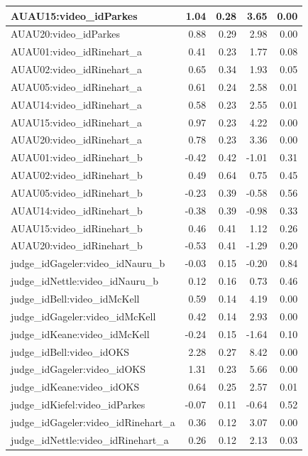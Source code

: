 \documentclass{monashthesis}
\begin{document}
\begin{tabular}{l|r|r|r|r}
\hline
AUAU15:video\_idParkes & 1.04 & 0.28 & 3.65 & 0.00\\
\hline
AUAU20:video\_idParkes & 0.88 & 0.29 & 2.98 & 0.00\\
\hline
AUAU01:video\_idRinehart\_a & 0.41 & 0.23 & 1.77 & 0.08\\
\hline
AUAU02:video\_idRinehart\_a & 0.65 & 0.34 & 1.93 & 0.05\\
\hline
AUAU05:video\_idRinehart\_a & 0.61 & 0.24 & 2.58 & 0.01\\
\hline
AUAU14:video\_idRinehart\_a & 0.58 & 0.23 & 2.55 & 0.01\\
\hline
AUAU15:video\_idRinehart\_a & 0.97 & 0.23 & 4.22 & 0.00\\
\hline
AUAU20:video\_idRinehart\_a & 0.78 & 0.23 & 3.36 & 0.00\\
\hline
AUAU01:video\_idRinehart\_b & -0.42 & 0.42 & -1.01 & 0.31\\
\hline
AUAU02:video\_idRinehart\_b & 0.49 & 0.64 & 0.75 & 0.45\\
\hline
AUAU05:video\_idRinehart\_b & -0.23 & 0.39 & -0.58 & 0.56\\
\hline
AUAU14:video\_idRinehart\_b & -0.38 & 0.39 & -0.98 & 0.33\\
\hline
AUAU15:video\_idRinehart\_b & 0.46 & 0.41 & 1.12 & 0.26\\
\hline
AUAU20:video\_idRinehart\_b & -0.53 & 0.41 & -1.29 & 0.20\\
\hline
judge\_idGageler:video\_idNauru\_b & -0.03 & 0.15 & -0.20 & 0.84\\
\hline
judge\_idNettle:video\_idNauru\_b & 0.12 & 0.16 & 0.73 & 0.46\\
\hline
judge\_idBell:video\_idMcKell & 0.59 & 0.14 & 4.19 & 0.00\\
\hline
judge\_idGageler:video\_idMcKell & 0.42 & 0.14 & 2.93 & 0.00\\
\hline
judge\_idKeane:video\_idMcKell & -0.24 & 0.15 & -1.64 & 0.10\\
\hline
judge\_idBell:video\_idOKS & 2.28 & 0.27 & 8.42 & 0.00\\
\hline
judge\_idGageler:video\_idOKS & 1.31 & 0.23 & 5.66 & 0.00\\
\hline
judge\_idKeane:video\_idOKS & 0.64 & 0.25 & 2.57 & 0.01\\
\hline
judge\_idKiefel:video\_idParkes & -0.07 & 0.11 & -0.64 & 0.52\\
\hline
judge\_idGageler:video\_idRinehart\_a & 0.36 & 0.12 & 3.07 & 0.00\\
\hline
judge\_idNettle:video\_idRinehart\_a & 0.26 & 0.12 & 2.13 & 0.03\\

\end{tabular}
\end{document}
